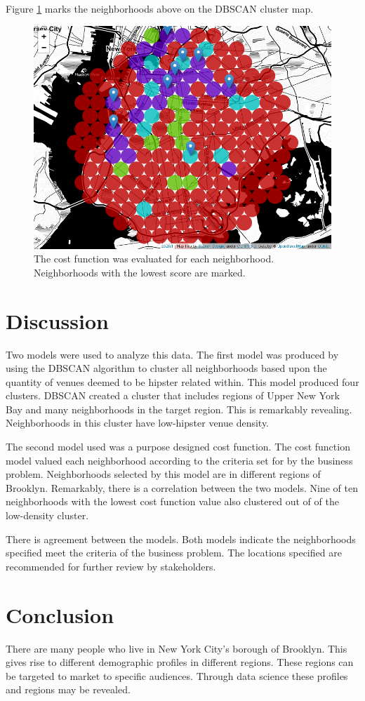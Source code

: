 \documentclass[12pt]{article}
\begin{document}
	Figure \ref{fig:csmap} marks the neighborhoods above on the DBSCAN cluster map.

\begin{figure}[H]
  \includegraphics[width=6.5in]{csmap.png}
	\caption{The cost function was evaluated for each neighborhood. Neighborhoods with the lowest score are marked.}
  \label{fig:csmap}
\end{figure}

\section{Discussion}
	Two models were used to analyze this data.
	The first model was produced by using the DBSCAN algorithm to cluster all neighborhoods based upon the quantity of venues deemed to be hipster related within.
	This model produced four clusters.
	DBSCAN created a cluster that includes regions of Upper New York Bay and many neighborhoods in the target region.
	This is remarkably revealing.
	Neighborhoods in this cluster have low-hipster venue density.

	The second model used was a purpose designed cost function.
	The cost function model valued each neighborhood according to the criteria set for by the business problem.
	Neighborhoods selected by this model are in different regions of Brooklyn.
	Remarkably, there is a correlation between the two models.
	Nine of ten neighborhoods with the lowest cost function value also clustered out of of the low-density cluster.

	There is agreement between the models.
	Both models indicate the neighborhoods specified meet the criteria of the business problem.
	The locations specified are recommended for further review by stakeholders.

\section{Conclusion}\label{conclusions}
	There are many people who live in New York City's borough of Brooklyn.
	This gives rise to different demographic profiles in different regions.
	These regions can be targeted to market to specific audiences.
	Through data science these profiles and regions may be revealed.
\end{document}
